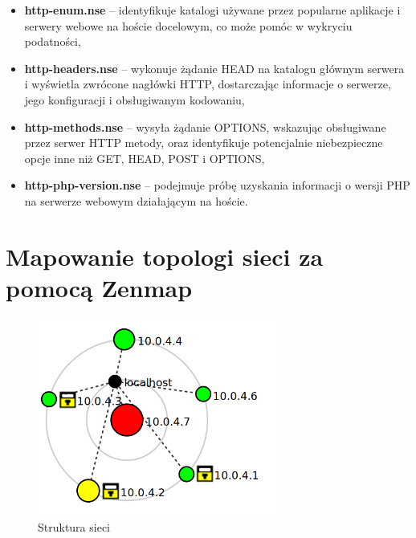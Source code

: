 \documentclass{article}
\begin{document}
\begin{itemize}
  \item \textbf{http-enum.nse} – identyfikuje katalogi używane przez popularne aplikacje i serwery webowe na hoście docelowym, co może pomóc w wykryciu podatności,
  \item \textbf{http-headers.nse} – wykonuje żądanie HEAD na katalogu głównym serwera i wyświetla zwrócone nagłówki HTTP, dostarczając informacje o serwerze, jego konfiguracji i obsługiwanym kodowaniu,
  \item \textbf{http-methods.nse} – wysyła żądanie OPTIONS, wskazując obsługiwane przez serwer HTTP metody, oraz identyfikuje potencjalnie niebezpieczne opcje inne niż GET, HEAD, POST i OPTIONS,
  \item \textbf{http-php-version.nse} – podejmuje próbę uzyskania informacji o wersji PHP na serwerze webowym działającym na hoście.
\end{itemize}


\section*{Mapowanie topologi sieci za pomocą Zenmap}

\begin{figure}[H]
  \centering
  \includegraphics[width=0.7\textwidth]{zenmap_topology.png}
  \caption{Struktura sieci}
\end{figure}
\end{document}
